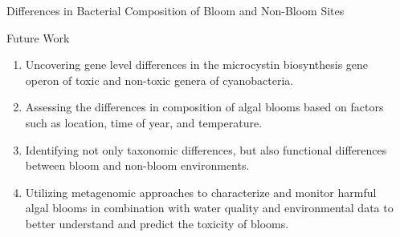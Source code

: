 \documentclass[final]{beamer}
\newlength{\sepwidth}
\newlength{\colwidth}
\newcommand{\separatorcolumn}{\begin{column}{\sepwidth}\end{column}}
\begin{document}
\begin{frame}[t]
\begin{columns}[t]
\begin{column}{\colwidth}
\begin{block}{Differences in Bacterial Composition of Bloom and Non-Bloom Sites}
  \end{block}
  
  \begin{block}{Future Work}
  
   \begin{enumerate}[$\Rightarrow$]
  \item Uncovering gene level differences in the microcystin biosynthesis gene operon of toxic and non-toxic genera of cyanobacteria.
  \item Assessing the differences in composition of algal blooms based on factors such as location, time of year, and temperature.
  \item Identifying not only taxonomic differences, but also functional differences between bloom and non-bloom environments.
  \item Utilizing metagenomic approaches to characterize and monitor harmful algal blooms in combination with water quality and environmental data to better understand and predict the toxicity of blooms.
  \end{enumerate}
    
  \end{block}





\end{column}

\separatorcolumn
\end{columns}
\end{frame}
\end{document}
